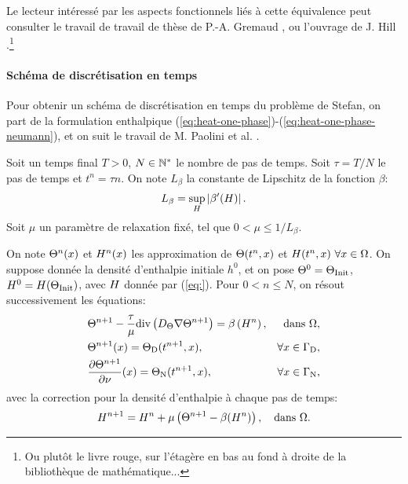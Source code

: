 Le lecteur intéressé par les aspects fonctionnels liés à cette
équivalence peut consulter le travail de travail de thèse de
P.-A. Gremaud \cite{Gremaud1991}, ou l'ouvrage de J. Hill
\cite{HillStefanProblems}.\footnote{Ou plutôt le livre rouge, sur
l'étagère en bas au fond à droite de la bibliothèque de
mathématique...}

\paragraph{Schéma de discrétisation en temps}
Pour obtenir un schéma de discrétisation en temps du problème de
Stefan, on part de la formulation enthalpique
(\ref{eq:heat-one-phase})-(\ref{eq:heat-one-phase-neumann}), et on
suit le travail de M. Paolini et al. \cite{Paolini1988}.

Soit un temps final $T > 0$, $N\in \mathbb {\mathbb N^*}$ le nombre de pas de
temps. Soit $\tau = T / N$ le pas de temps et $t^n = \tau n$. On note
$L_\beta$ la constante de Lipschitz de la fonction $\beta$:
\begin{equation}
  L_\beta = \sup_{H}\left\lvert \beta'(H) \right\rvert.
\end{equation}
Soit $\mu$ un paramètre de relaxation fixé, tel que $0 < \mu \leq
1/L_\beta$.

On note $\Theta^n(x)$ et $H^n(x)$ les approximation
de $\Theta(t^n, x)$ et $H(t^n, x)\ \forall x\in
\Omega$.  On suppose donnée la densité d'enthalpie initiale $h^0$, et
on pose $\Theta^0 = \Theta_\text{Init}$, $H^0 = H(\Theta_\text{Init})$,
avec $H$ donnée par (\ref{eq:}). Pour $0 < n \leq N$, on résout
successivement les équations:
\begin{align}
  &\temperature^{n+1} - \frac{\tau}{\mu} \div\parent{
    \electrolytetdiff \nabla\temperature^{n+1}} = %
  \beta\parent{\enthalpydensity^n}, & \text{dans } \Omega,\label{eq:chernoff-heat}\\
  &\temperature^{n+1}(x) = \temperature_{\mathrm D}(t^{n+1}, x), &
  \forall x\in%
  \Gamma_\mathrm{D},\label{eq:chernoff-dirichlet}\\
  &\frac{\partial\temperature^{n+1}}{\partial \nu}(x) = %
  \temperature_\mathrm{N}(t^{n+1}, x), %
  & \forall x \in \Gamma_\mathrm{N},\label{eq:chernoff-neumann}
\end{align}
avec la correction pour la densité d'enthalpie à chaque pas de temps:
\begin{equation}\label{eq:chernoff-update}
H^{n+1} = H^{n} +
\mu\left( \Theta^{n+1} - \beta(H^{n}) \right), \quad
\text{dans } \Omega.
\end{equation}

